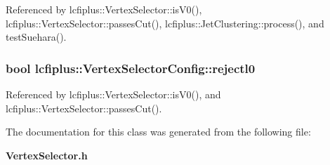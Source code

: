 Referenced by lcfiplus\-::\-Vertex\-Selector\-::is\-V0(), lcfiplus\-::\-Vertex\-Selector\-::passes\-Cut(), lcfiplus\-::\-Jet\-Clustering\-::process(), and test\-Suehara().

\subsubsection[{rejectl0}]{\setlength{\rightskip}{0pt plus 5cm}bool lcfiplus\-::\-Vertex\-Selector\-Config\-::rejectl0}\label{classlcfiplus_1_1VertexSelectorConfig_a73a2c1780bcbe3a7bdd867b7717da57f}


Referenced by lcfiplus\-::\-Vertex\-Selector\-::is\-V0(), and lcfiplus\-::\-Vertex\-Selector\-::passes\-Cut().



The documentation for this class was generated from the following file\-:\begin{DoxyCompactItemize}
\item 
{\bf Vertex\-Selector.\-h}\end{DoxyCompactItemize}
